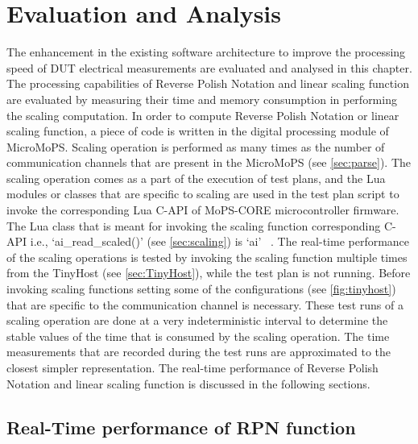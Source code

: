 \chapter{Evaluation and Analysis}
The enhancement in the existing software architecture to improve the processing speed of DUT electrical measurements are evaluated and analysed in this chapter. 
The processing capabilities of Reverse Polish Notation and linear scaling function are evaluated by measuring their time and memory consumption in performing the scaling computation. 
In order to compute Reverse Polish Notation or linear scaling function, a piece of code is written in the digital processing module of MicroMoPS. 
Scaling operation is performed as many times as the number of communication channels that are present in the MicroMoPS (see \cref{sec:parse}). The scaling operation comes as a part of the execution of test plans, and the Lua modules or classes that are specific to scaling are used in the test plan script to invoke the corresponding Lua C-API of MoPS-CORE microcontroller firmware. The Lua class that is meant for invoking the scaling function corresponding C-API i.e., `ai\_read\_scaled()' (see \cref{sec:scaling}) is `ai' ~\cite{Steinwender2016}. The real-time performance of the scaling operations is tested by invoking the scaling function multiple times from the TinyHost (see \cref{sec:TinyHost}), while the test plan is not running. Before invoking scaling functions setting some of the configurations (see \cref{fig:tinyhost}) that are specific to the communication channel is necessary. These test runs of a scaling operation are done at a very indeterministic interval to determine the stable values of the time that is consumed by the scaling operation. The time measurements that are recorded during the test runs are approximated to the closest simpler representation.        
The real-time performance of Reverse Polish Notation and linear scaling function is discussed in the following sections. 

\section*{Real-Time performance of RPN function}

